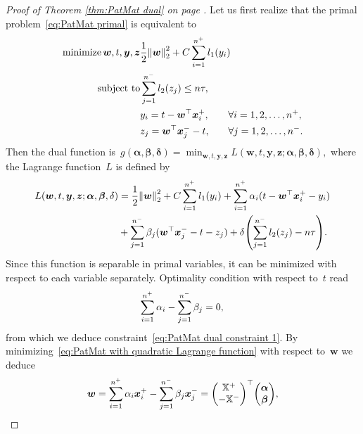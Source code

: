 \patmatdual*
\begin{proof}[Proof of Theorem \ref{thm:PatMat dual} on page \pageref{thm:PatMat dual}]
  Let us first realize that the primal \PatMat  problem~\eqref{eq:PatMat primal} is equivalent to
  \begin{alignat*}{2}
    \minimize{\bm{w}, t, \bm{y}, \bm{z}}
    & \frac{1}{2} \norm{\bm{w}}_{2}^{2} + C \sum_{i = 1}^{n^+} l_1(y_i) \span \span \\
    \st 
    & \sum_{j = 1}^{n^-} l_2(z_j) \leq n \tau, \\
    & y_i = t - \bm{w}^{\top}\bm{x}^+_{i}, && \quad \forall i = 1, 2, \ldots, n^+, \\
    & z_j = \bm{w}^{\top}\bm{x}_{j}^- - t, && \quad \forall j = 1, 2, \ldots, n^-.
  \end{alignat*}
  Then the dual function is~$g(\bm{\alpha}, \bm{\beta}, \bm{\delta}) = \min_{\bm{w}, t, \bm{y}, \bm{z}} L(\bm{w}, t, \bm{y}, \bm{z}; \bm{\alpha}, \bm{\beta}, \bm{\delta}),$ where the Lagrange function~$L$ is defined by
  \begin{equation}\label{eq:PatMat with quadratic Lagrange function}
    \begin{aligned}
      L(\bm{w}, t, \bm{y}, \bm{z}; \bm{\alpha}, \bm{\beta}, \delta)
      & = \frac{1}{2} \norm{\bm{w}}_{2}^{2}
        + C \sum_{i = 1}^{n^+} l_1(y_i)
        + \sum_{i = 1}^{n^+} \alpha_i(t - \bm{w}^{\top}\bm{x}^+_{i} - y_i) \\
      & + \sum_{j = 1}^{n^-} \beta_j(\bm{w}^{\top}\bm{x}_j^- - t - z_j)
        + \delta \Brac{\sum_{j = 1}^{n^-} l_2(z_j) - n \tau}. 
    \end{aligned}
  \end{equation}
  Since this function is separable in primal variables, it can be minimized with respect to each variable separately. Optimality condition with respect to~$t$ read
  \begin{equation*}
      \sum_{i = 1}^{n^+} \alpha_i - \sum_{j = 1}^{n^-} \beta_j = 0, \\
  \end{equation*}
  from which we deduce constraint~\eqref{eq:PatMat dual constraint 1}. By minimizing~\eqref{eq:PatMat with quadratic Lagrange function} with respect to~$\bm{w}$ we deduce
  \begin{equation*}
    \bm{w}
    = \sum_{i = 1}^{n^+} \alpha_i \bm{x}^+_i - \sum_{j = 1}^{n^-} \beta_j \bm{x}_j^-
    = \Matrix{\X^+ \\ - \X^-}^\top \Matrix{\bm{\alpha} \\ \bm{\beta}},

\end{equation*}
\end{proof}
